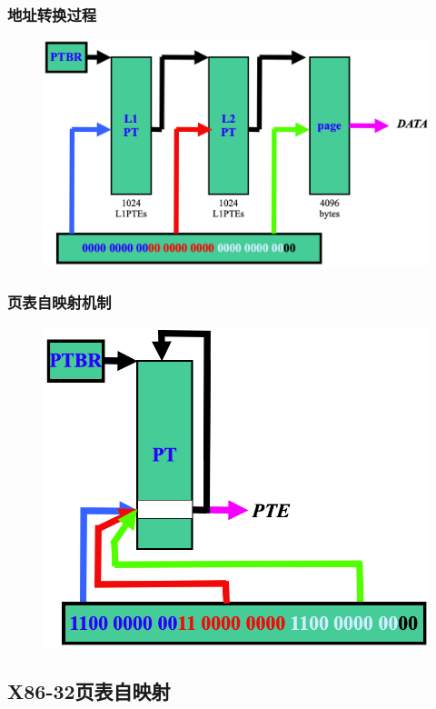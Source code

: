 % 
% 
% 
\begin{frame}
    \frametitle{地址转换过程}
    \begin{figure}
    \includegraphics[width=0.75\linewidth]{figs/addr-translation.png}
    \end{figure}
\end{frame}
% 
% 
% 
\begin{frame}
    \frametitle{页表自映射机制}
    \begin{figure}
    \includegraphics[width=0.55\linewidth]{figs/self-mapping-PTE.png}
    \end{figure}
\end{frame}
% 
\subsection{X86-32页表自映射} %

